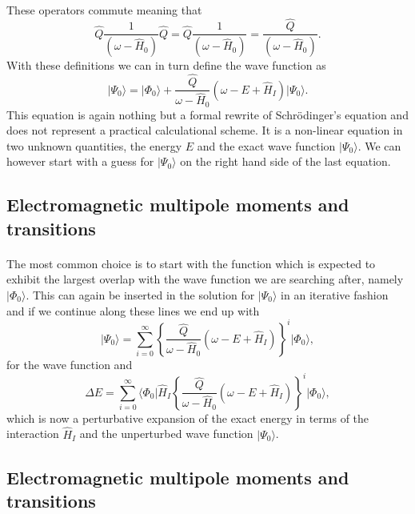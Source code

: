 \documentclass[%
twoside,                 %
final,                   %
10pt]{article}
\begin{document}
\paragraph{}
These operators commute meaning that
\[
\hat{Q}\frac{1}{\left(\omega-\hat{H}_0\right)}\hat{Q}=\hat{Q}\frac{1}{\left(\omega-\hat{H}_0\right)}=\frac{\hat{Q}}{\left(\omega-\hat{H}_0\right)}.
\]
With these definitions we can in turn define the wave function as 
\[
\vert \Psi_0\rangle=\vert \Phi_0\rangle+\frac{\hat{Q}}{\omega-\hat{H}_0}\left(\omega-E+\hat{H}_I\right)\vert \Psi_0\rangle.
\]
This equation is again nothing but a formal rewrite of Schr\"odinger's equation
and does not represent a practical calculational scheme.  
It is a non-linear equation in two unknown quantities, the energy $E$ and the exact
wave function $\vert \Psi_0\rangle$. We can however start with a guess for $\vert \Psi_0\rangle$ on the right hand side of the last equation.



\subsection*{Electromagnetic multipole moments and transitions}

\paragraph{}
 The most common choice is to start with the function which is expected to exhibit the largest overlap with the wave function we are searching after, namely $\vert \Phi_0\rangle$. This can again be inserted in the solution for $\vert \Psi_0\rangle$ in an iterative fashion and if we continue along these lines we end up with
\[
\vert \Psi_0\rangle=\sum_{i=0}^{\infty}\left\{\frac{\hat{Q}}{\omega-\hat{H}_0}\left(\omega-E+\hat{H}_I\right)\right\}^i\vert \Phi_0\rangle, 
\]
for the wave function and
\[
\Delta E=\sum_{i=0}^{\infty}\langle \Phi_0\vert \hat{H}_I\left\{\frac{\hat{Q}}{\omega-\hat{H}_0}\left(\omega-E+\hat{H}_I\right)\right\}^i\vert \Phi_0\rangle, 
\]
which is now  a perturbative expansion of the exact energy in terms of the interaction
$\hat{H}_I$ and the unperturbed wave function $\vert \Psi_0\rangle$.



\subsection*{Electromagnetic multipole moments and transitions}
\end{document}
